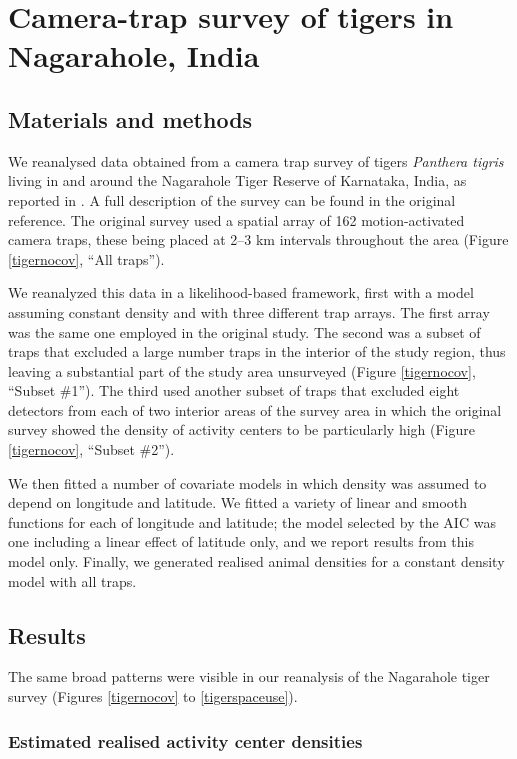 \documentclass[a4paper,12pt]{article}
\begin{document}
\section{Camera-trap survey of tigers in Nagarahole, India}

\subsection{Materials and methods}
We reanalysed data obtained from a camera trap survey of tigers {\it Panthera tigris} living in and around the Nagarahole Tiger Reserve of Karnataka, India, as reported in \cite{Dorazio2017}. A full description of the survey can be found in the original reference. The original survey used a spatial array of 162 motion-activated camera traps, these being placed at 2–3 km intervals throughout the area (Figure \ref{tigernocov}, ``All traps''). 

We reanalyzed this data in a likelihood-based framework, first with a model assuming constant density and with three different trap arrays. The first array was the same one employed in the original study. The second was a subset of traps that excluded a large number traps in the interior of the study region, thus leaving a substantial part of the study area unsurveyed (Figure \ref{tigernocov}, ``Subset \#1''). The third used another subset of traps that excluded eight detectors from each of two interior areas of the survey area in which the original survey showed the density of activity centers to be particularly high (Figure \ref{tigernocov}, ``Subset \#2''). 

We then fitted a number of covariate models in which density was assumed to depend on longitude and latitude. We fitted a variety of linear and smooth functions for each of longitude and latitude; the model selected by the AIC was one including a linear effect of latitude only, and we report results from this model only. Finally, we generated realised animal densities for a constant density model with all traps.

\subsection{Results} 
The same broad patterns were visible in our reanalysis of the Nagarahole tiger survey (Figures \ref{tigernocov} to \ref{tigerspaceuse}). 

\subsubsection{Estimated realised activity center densities}
\end{document}
